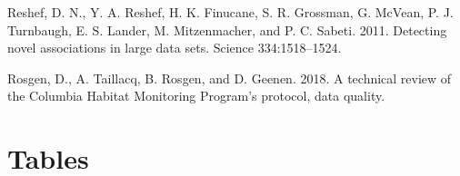 \documentclass[
  12pt,
]{article}
\begin{document}
\leavevmode\hypertarget{ref-Reshef2011}{}%
Reshef, D. N., Y. A. Reshef, H. K. Finucane, S. R. Grossman, G. McVean, P. J. Turnbaugh, E. S. Lander, M. Mitzenmacher, and P. C. Sabeti. 2011. Detecting novel associations in large data sets. Science 334:1518--1524.

\leavevmode\hypertarget{ref-Rosgen2018}{}%
Rosgen, D., A. Taillacq, B. Rosgen, and D. Geenen. 2018. A technical review of the Columbia Habitat Monitoring Program's protocol, data quality.

\newpage

\hypertarget{tables}{%
\section{Tables}\label{tables}}

\begingroup\fontsize{10}{12}\selectfont
\end{document}
